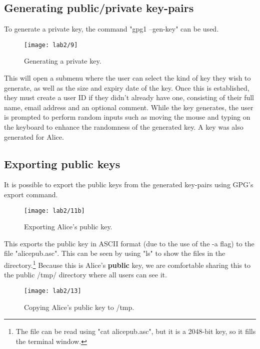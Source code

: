 \subsection{Generating public/private key-pairs}\label{subsec:generating-private-keys}

To generate a private key, the command "gpg1 --gen-key" can be used.

\begin{figure}[H]
    \centering
    \texttt{[image: lab2/9]}
    \caption{Generating a private key.}
    \label{fig:GPGgen}
\end{figure}

This will open a submenu where the user can select the kind of key they wish to generate,
as well as the size and expiry date of the key.
Once this is established, they must create a user ID if they didn't already have one,
consisting of their full name, email address and an optional comment.
While the key generates, the user is prompted to perform random inputs such as moving the mouse
and typing on the keyboard to enhance the randomness of the generated key.
A key was also generated for Alice.

\subsection{Exporting public keys}\label{subsec:exporting-public-keys}
It is possible to export the public keys from the generated key-pairs using GPG's export command.

\begin{figure}[H]
    \centering
    \texttt{[image: lab2/11b]}
    \caption{Exporting Alice's public key.}
    \label{fig:GPGexport}
\end{figure}

\noindent This exports the public key in ASCII format (due to the use of the -a flag) to the file "alicepub.asc".
This can be seen by using "ls" to show the files in the directory.\footnote{The file can be read using "cat alicepub.asc", but it is a 2048-bit key, so it fills the terminal window.}
Because this is Alice's \textbf{public} key, we are comfortable sharing this to the public /tmp/ directory where all
users can see it.

\begin{figure}[H]
    \centering
    \texttt{[image: lab2/13]}
    \caption{Copying Alice's public key to /tmp.}
    \label{fig:alicePubTmp}
\end{figure}


